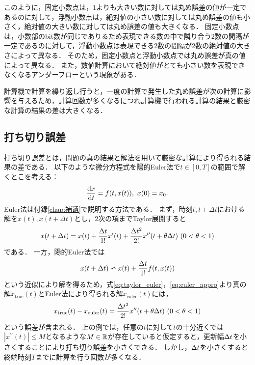 このように，固定小数点は，$1$よりも大きい数に対しては丸め誤差の値が一定であるのに対して，浮動小数点は，絶対値の小さい数に対しては丸め誤差の値も小さく，絶対値の大きい数に対しては丸め誤差の値も大きくなる．
固定小数点は，小数部のbit数が同じでありるため表現できる数の中で隣り合う2数の間隔が一定であるのに対して，浮動小数点は表現できる2数の間隔が2数の絶対値の大きさによって異なる．
そのため，固定小数点と浮動小数点では丸め誤差が真の値によって異なる．
また，数値計算において絶対値がとても小さい数を表現できなくなるアンダーフローという現象がある．


計算機で計算を繰り返し行うと，一度の計算で発生した丸め誤差が次の計算に影響を与えるため，計算回数が多くなるにつれ計算機で行われる計算の結果と厳密な計算の結果の差は大きくなる．

\subsection{打ち切り誤差}
打ち切り誤差とは，問題の真の結果と解法を用いて厳密な計算により得られる結果の差である．
以下のような微分方程式を陽的Euler法で$t \in [0,T]$の範囲で解くとこを考える：
\begin{equation*}
    \frac{\mathrm{d}x}{\mathrm{d}t} = f(t,x(t)), \ x(0) = x_0.
\end{equation*}
Euler法は付録\ref{chap:補遺}で説明する方法である．
まず，時刻$t,t+\Delta t$における解を$x(t),x(t+\Delta t)$とし，2次の項までTaylor展開すると
\begin{align}
    \label{eq:taylor_euler}
    x(t + \Delta t) = x(t) + \frac{\Delta t}{1!}x^{\prime}(t) + \frac{\Delta t^2}{2!}x^{\prime\prime}(t + \theta\Delta t) \ (0 < \theta < 1)
\end{align}
である．
一方，陽的Euler法では
\begin{align}
    \label{eq:euler_appro}
    x(t + \Delta t) \backsimeq x(t) + \frac{\Delta t}{1!}f(t,x(t))
\end{align}
という近似により解を得るため，式\eqref{eq:taylor_euler}，\eqref{eq:euler_appro}より真の解$x_{\mathrm{true}}(t)$とEuler法により得られる解$x_{\mathrm{euler}}(t)$には，
\begin{align*}
    x_{\mathrm{true}}(t) - x_{\mathrm{euler}}(t) = \frac{\Delta t^2}{2!}x^{\prime\prime}(t + \theta\Delta t) \ (0 < \theta < 1)
\end{align*}
という誤差が含まれる．
上の例では，任意の$t$に対して$t$の十分近くでは$|x^{\prime\prime}(t)| \leq M$となるような$M \in \mathbb{R}$が存在していると仮定すると，更新幅$\Delta t$を小さくすることにより打ち切り誤差を小さくできる．
しかし，$\Delta t$を小さくすると終端時刻$T$までに計算を行う回数が多くなる．
